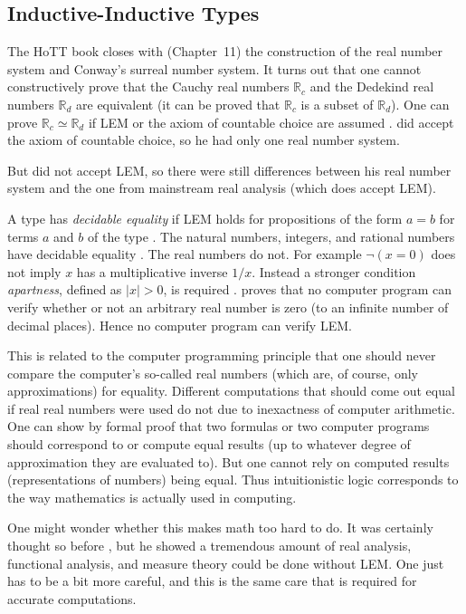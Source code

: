 \documentclass[11pt]{article}
\newcommand{\real}{\mathbb{R}}
\begin{document}
\subsection{Inductive-Inductive Types}
\label{sec:inductive-inductive}

The HoTT book closes with (Chapter~11) the construction of the real number
system and Conway's surreal number system.  It turns out that one cannot
constructively prove that the Cauchy real numbers $\real_c$ and the Dedekind
real numbers $\real_d$ are equivalent (it can be proved that $\real_c$ is
a subset of $\real_d$).
One can prove $\real_c \simeq \real_d$ if LEM or the axiom of countable choice
are assumed .
\citet{bishop} did accept the axiom of countable choice, so he had only one
real number system.

But \citet{bishop} did not accept LEM, so there were still differences between
his real number system and the one from mainstream real analysis (which does
accept LEM).

A type has \emph{decidable equality} if
LEM holds for propositions of the form $a = b$ for terms $a$ and $b$ of the
type .
The natural numbers, integers, and rational numbers
have decidable equality .
The real numbers do not.  For example $\neg (x = 0)$ does not imply $x$ has
a multiplicative inverse $1 / x$.  Instead a stronger condition
\emph{apartness}, defined as $\lvert x \rvert > 0$, is required
.
\citet[Section~3.2]{bauer-constructive} proves that no computer program
can verify whether or not an arbitrary real number is zero
(to an infinite number of decimal places).
Hence no computer program can verify LEM.

This is related to the computer programming principle that one should never
compare the computer's so-called real numbers (which are, of course, only
approximations) for equality.  Different computations that should come out
equal if real real numbers were used do not due to inexactness of computer
arithmetic.  One can show by formal proof that two formulas or two computer
programs should correspond to or compute equal results (up to whatever
degree of approximation they are evaluated to).  But one cannot rely on
computed results (representations of numbers) being equal.  Thus intuitionistic
logic corresponds to the way mathematics is actually used in computing.

One might wonder whether this makes math too hard to do.
It was certainly thought so before \citet{bishop},
but he showed a tremendous amount of real analysis, functional analysis,
and measure theory could be done without LEM.  One just has to be a bit
more careful, and this is the same care that is required for
accurate computations.
\end{document}
